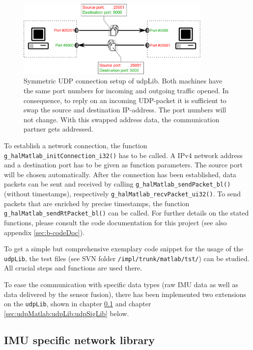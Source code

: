\begin{figure}[H]
    \centering
    \includegraphics[width=0.85\textwidth]{fig/ch-matlab-lib/symUdpConnect}
    \caption[Symmetric UDP connection setup]{Symmetric UDP connection setup of udpLib. Both machines have the same port numbers for incoming and outgoing traffic opened. In consequence, to reply on an incoming UDP-packet it is sufficient to swap the source and destination IP-address. The port numbers will not change. With this swapped address data, the communication partner gets addressed.}
    \label{fig:udpMatlab:udpLib:synUdpConnect}
\end{figure}

To establish a network connection, the function \texttt{g\_halMatlab\_initConnection\_i32()} has to be called. A IPv4 network address and a destination port has to be given as function parameters. The source port will be chosen automatically. After the connection has been established, data packets can be sent and received by calling \texttt{g\_halMatlab\_sendPacket\_bl()} (without timestamps), respectively \texttt{g\_halMatlab\_recvPacket\_ui32()}. To send packets that are enriched by precise timestamps, the function \texttt{g\_halMatlab\_sendRtPacket\_bl()} can be called. For further details on the stated functions, please consult the code documentation for this project (see also appendix \ref{sec:b-codeDoc}).

To get a simple but comprehensive exemplary code snippet for the usage of the \texttt{udpLib}, the test files (see SVN folder \texttt{/impl/trunk/matlab/tst/}) can be studied. All crucial steps and functions are used there.

To ease the communication with specific data types (raw IMU data as well as data delivered by the sensor fusion), there has been implemented two extensions on the \texttt{udpLib}, shown in chapter \ref{sec:udpMatlab:udpLib:udpImuLib} and chapter \ref{sec:udpMatlab:udpLib:udpSigLib} below.

\subsection{IMU specific network library}
\label{sec:udpMatlab:udpLib:udpImuLib}

